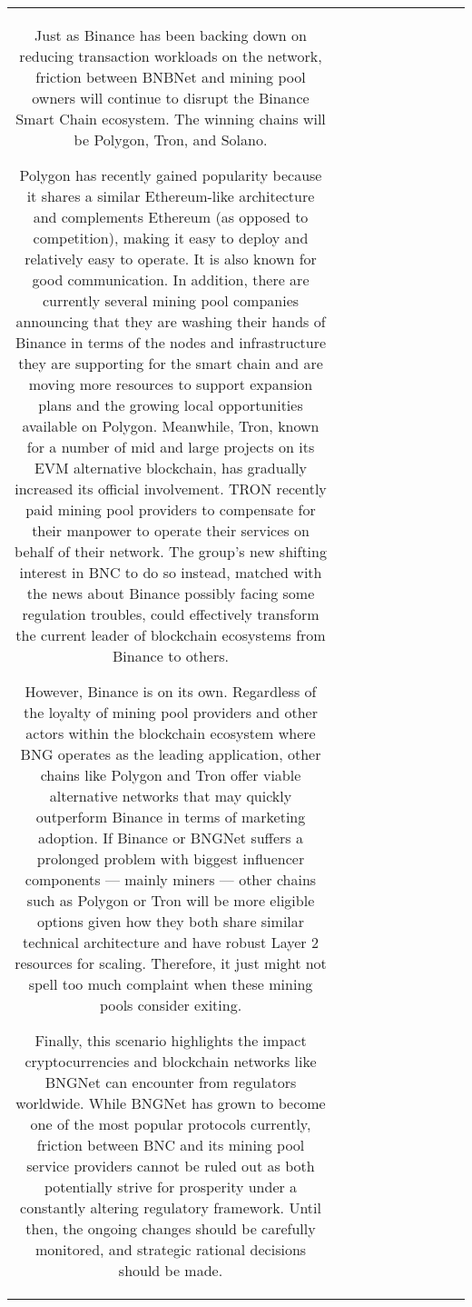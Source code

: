 \begin{table}[h!]
\begin{tabular}{|c|c|c|c|c|c|c|c|c|c|}
Just as Binance has been backing down on reducing transaction workloads on the network, friction between BNBNet and mining pool owners will continue to disrupt the Binance Smart Chain ecosystem. The winning chains will be Polygon, Tron, and Solano.

Polygon has recently gained popularity because it shares a similar Ethereum-like architecture and complements Ethereum (as opposed to competition), making it easy to deploy and relatively easy to operate. It is also known for good communication. In addition, there are currently several mining pool companies announcing that they are washing their hands of Binance in terms of the nodes and infrastructure they are supporting for the smart chain and are moving more resources to support expansion plans and the growing local opportunities available on Polygon. Meanwhile, Tron, known for a number of mid and large projects on its EVM alternative blockchain, has gradually increased its official involvement. TRON recently paid mining pool providers to compensate for their manpower to operate their services on behalf of their network. The group’s new shifting interest in BNC to do so instead, matched with the news about Binance possibly facing some regulation troubles, could effectively transform the current leader of blockchain ecosystems from Binance to others.

However, Binance is on its own. Regardless of the loyalty of mining pool providers and other actors within the blockchain ecosystem where BNG operates as the leading application, other chains like Polygon and Tron offer viable alternative networks that may quickly outperform Binance in terms of marketing adoption. If Binance or BNGNet suffers a prolonged problem with biggest influencer components — mainly miners — other chains such as Polygon or Tron will be more eligible options given how they both share similar technical architecture and have robust Layer 2 resources for scaling. Therefore, it just might not spell too much complaint when these mining pools consider exiting.

Finally, this scenario highlights the impact cryptocurrencies and blockchain networks like BNGNet can encounter from regulators worldwide. While BNGNet has grown to become one of the most popular protocols currently, friction between BNC and its mining pool service providers cannot be ruled out as both potentially strive for prosperity under a constantly altering regulatory framework. Until then, the ongoing changes should be carefully monitored, and strategic rational decisions should be made.



\end{tabular}
\end{table}

